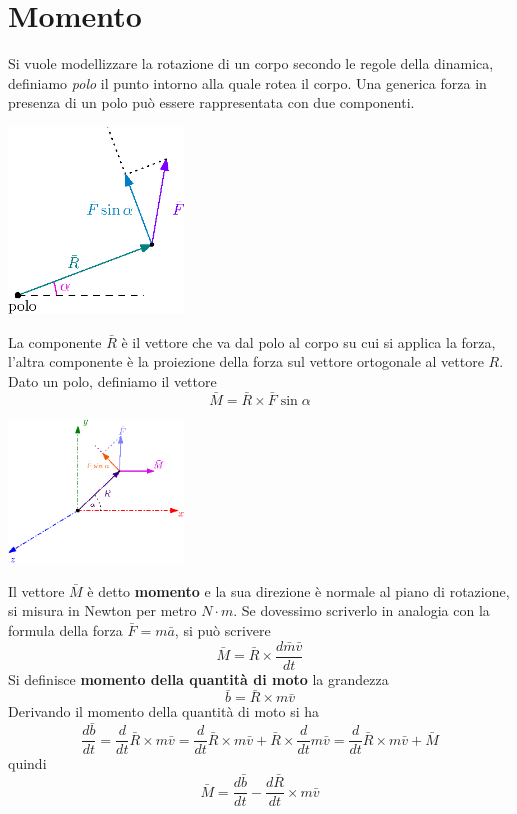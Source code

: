 \documentclass[10pt, letterpaper]{report}
\begin{document}
\flowerLine 
\section{Momento}
Si vuole modellizzare la rotazione di un corpo secondo le 
regole della dinamica, definiamo \textit{polo} il punto 
intorno alla quale rotea il corpo. Una generica forza in presenza di un 
polo può essere rappresentata con due componenti.\begin{center}
    \includegraphics[width=0.35\textwidth]{images/momento1.eps}
\end{center}
La componente $\bar R$ è il vettore che va dal polo al corpo su cui 
si applica la forza, l'altra componente è la proiezione 
della forza sul vettore ortogonale al vettore $R$.
Dato un polo, definiamo il vettore 
$$ \bar M = \bar R \times \bar F\sin\alpha$$
\begin{center}
    \includegraphics[width=0.35\textwidth]{images/momentoAngolare.eps}
\end{center}
Il vettore $\bar M$ è detto \textbf{momento} e la sua direzione è 
normale al piano di rotazione, si misura in Newton per metro $N\cdot m$.
Se dovessimo scriverlo in analogia con la formula della forza $\bar F = m\bar a$, si 
può scrivere 
$$ \bar M = \bar R \times \frac{d\bar m\bar v}{dt}$$
Si definisce \textbf{momento della quantità di moto } la grandezza 
$$ \bar b = \bar R\times m\bar v$$
Derivando il momento della quantità di moto si ha 
$$\frac{d\bar b}{dt}=\frac{d}{dt}\bar R \times m\bar v=
\frac{d}{dt}\bar R \times m\bar v + \bar R \times \frac{d}{dt}m\bar v = 
\frac{d}{dt}\bar R \times m\bar v + \bar M $$
quindi 
$$\bar M=\frac{d\bar b}{dt}-\frac{d\bar R}{dt}\times m \bar v$$ 
\end{document}
